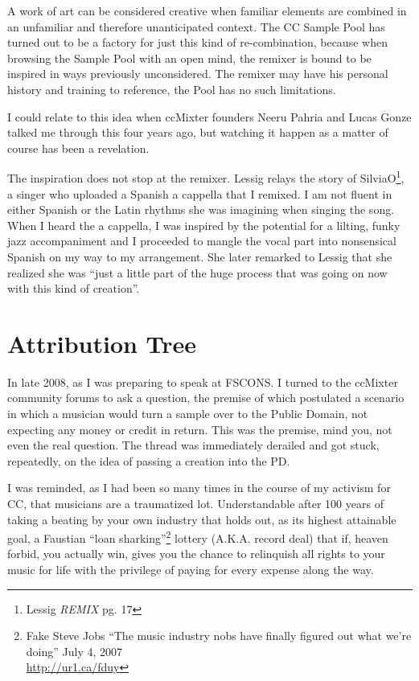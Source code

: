 A work of art can be considered creative when familiar elements are combined in
an unfamiliar and therefore unanticipated context. The CC Sample Pool has turned
out to be a factory for just this kind of re-combination, because when browsing
the Sample Pool with an open mind, the remixer is bound to be inspired in ways
previously unconsidered. The remixer may have his personal history and training
to reference, the Pool has no such limitations.

I could relate to this idea when ccMixter founders Neeru Pahria and Lucas Gonze
talked me through this four years ago, but watching it happen as a matter of
course has been a revelation. 

The inspiration does not stop at the remixer. Lessig relays the story of
SilviaO\footnote{Lessig \textit{REMIX} pg. 17}, a singer who uploaded a
Spanish a cappella that I remixed. I am not f\hbox{}luent in either Spanish or
the Latin rhythms she was imagining when singing the song. When I heard the
a cappella, I was inspired by the potential for a lilting, funky jazz
accompaniment and I proceeded to mangle the vocal part into nonsensical Spanish
on my way to my arrangement. She later remarked to Lessig that she realized she
was ``just a little part of the huge process that was going on now with this
kind of creation''.


\section{Attribution Tree}
\label{s:unexpected_collaboration:attribution_tree}

In late 2008, as I was preparing to speak at FSCONS. I turned to the ccMixter
community forums to ask a question, the premise of which postulated a scenario
in which a musician would turn a sample over to the Public Domain, not expecting
any money or credit in return. This was the premise, mind you, not even the real
question. The thread was immediately derailed and got stuck, repeatedly, on the
idea of passing a creation into the PD.

I was reminded, as I had been so many times in the course of my activism for CC,
that musicians are a traumatized lot. Understandable after 100 years of taking a
beating by your own industry that holds out, as its highest attainable goal, a
Faustian ``loan sharking''\footnote{Fake Steve Jobs ``The music industry nobs
have f\hbox{}inally f\hbox{}igured out what we're doing'' July 4, 2007\\
\url{http://ur1.ca/fduy}} lottery (A.K.A. record deal) that if,
heaven forbid, you actually win, gives you the chance to relinquish all rights
to your music for life with the privilege of paying for every expense along the
way.

